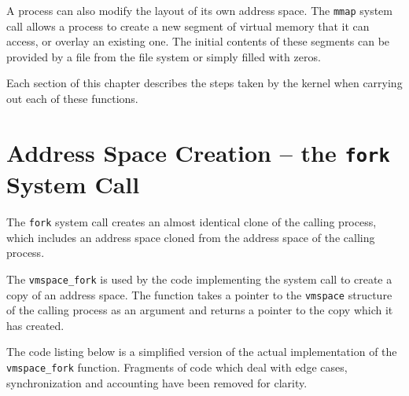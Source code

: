 \documentclass[shortabstract, english]{iithesis}
\begin{document}
A process can also modify the layout of its own address space. The \texttt{mmap}
\cite{freebsd:mmap} system call allows a process to create a new segment of
virtual memory that it can access, or overlay an existing one. The initial
contents of these segments can be provided by a file from the file system or
simply filled with zeros.

Each section of this chapter describes the steps taken by the kernel when
carrying out each of these functions.

\section{Address Space Creation -- the \texttt{fork} System Call}

The \texttt{fork} \cite{freebsd:fork} system call creates an almost identical clone of the calling
process, which includes an address space cloned from the address space of the
calling process.

The \texttt{vmspace_fork} is used by the code implementing the system
call to create a copy of an address space. The function takes a pointer to the
\texttt{vmspace} structure of the calling process as an argument and
returns a pointer to the copy which it has created.

The code listing below is a simplified version of the actual implementation of
the \texttt{vmspace_fork} function. Fragments of code which deal with
edge cases, synchronization and accounting have been removed for clarity.
\end{document}
